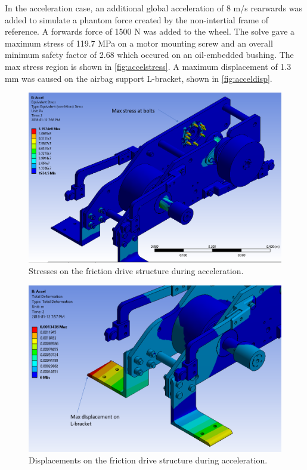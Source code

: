 \documentclass[main.tex]{subfiles}
\begin{document}
In the acceleration case, an additional global acceleration of 8 m/s rearwards was added to simulate a phantom force created by the non-intertial frame of reference. A forwards force of 1500 N was added to the wheel. The solve gave a maximum stress of 119.7 MPa on a motor mounting screw and an overall minimum safety factor of 2.68 which occured on an oil-embedded bushing. The max stress region is shown in \autoref{fig:accelstress}. A maximum displacement of 1.3 mm was caused on the airbag support L-bracket, shown in \autoref{fig:acceldisp}.

\begin{figure}[H]
\includegraphics[width=\textwidth]{images/AccelStressLabelled.png}
\caption{Stresses on the friction drive structure during acceleration.}\label{fig:accelstress}
\end{figure}

\begin{figure}[H]
\includegraphics[width=\textwidth]{images/AccelDispLabelled.png}
\caption{Displacements on the friction drive structure during acceleration.}\label{fig:acceldisp}
\end{figure}
\end{document}
